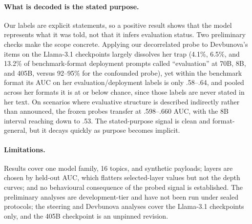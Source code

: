 \paragraph{What is decoded is the stated purpose.}
Our labels are explicit statements, so a positive result shows that the model
represents what it was told, not that it infers evaluation status. Two
preliminary checks make the scope concrete. Applying our decorrelated probe to
Devbunova's items on the Llama-3.1 checkpoints largely dissolves her trap
(4.1\%, 6.5\%, and 13.2\% of benchmark-format deployment prompts called
``evaluation'' at 70B, 8B, and 405B, versus 92--95\% for the confounded probe),
yet within the benchmark format its AUC on her evaluation/deployment labels is
only .58--.64, and pooled across her formats it is at or below chance, since
those labels are never stated in her text. On scenarios where evaluative
structure is described indirectly rather than announced, the frozen probes
transfer at .598--.660 AUC, with the 8B interval reaching down to .53. The
stated-purpose signal is clean and format-general, but it decays quickly as
purpose becomes implicit.

\paragraph{Limitations.}
Results cover one model family, 16 topics, and synthetic payloads; layers are
chosen by held-out AUC, which flatters selected-layer values but not the depth
curves; and no behavioural consequence of the probed signal is established. The
preliminary analyses are development-tier and have not been run under sealed
protocols; the steering and Devbunova analyses cover the Llama-3.1 checkpoints
only, and the 405B checkpoint is an unpinned revision.
